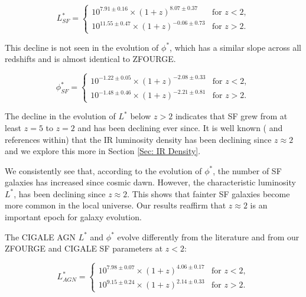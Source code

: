\begin{equation*}
    L^{*}_{SF} =
    \begin{cases} 
        10^{7.91 \pm 0.16} \times (1+z)^{8.07 \pm 0.37} & \text{for } z < 2, \\
        10^{11.55 \pm 0.47} \times (1+z)^{-0.06 \pm 0.73} & \text{for } z > 2.
    \end{cases}
\end{equation*}

This decline is not seen in the evolution of $\phi^{*}$, which has a similar slope across all redshifts and is almost identical to ZFOURGE. 

\begin{equation*}
    \phi^{*}_{SF} =
    \begin{cases} 
        10^{-1.22 \pm 0.05} \times (1+z)^{-2.08 \pm 0.33} & \text{for } z < 2, \\
        10^{-1.48 \pm 0.46} \times (1+z)^{-2.21 \pm 0.81} & \text{for } z > 2.
    \end{cases}
\end{equation*}

The decline in the evolution of $L^{*}$ below $z>2$ indicates that SF grew from at least $z=5$ to $z=2$ and has been declining ever since. It is well known (\citealp{gruppioni_herschel_2013,  madau_cosmic_2014} and references within) that the IR luminosity density has been declining since $z\approx2$ and we explore this more in Section \ref{Sec: IR Density}. 

We consistently see that, according to the evolution of $\phi^{*}$, the number of SF galaxies has increased since cosmic dawn. However, the characteristic luminosity $L^{*}$, has been declining since $z\approx2$. This shows that fainter SF galaxies become more common in the local universe. Our results reaffirm that $z\approx2$ is an important epoch for galaxy evolution.

The CIGALE AGN $L^{*}$ and $\phi^{*}$ evolve differently from the literature and from our ZFOURGE and CIGALE SF parameters at $z<2$:

\begin{equation*}
    L^{*}_{AGN} =
    \begin{cases} 
        10^{7.98 \pm 0.07} \times (1+z)^{4.06 \pm 0.17} & \text{for } z < 2, \\
        10^{9.15 \pm 0.24} \times (1+z)^{2.14 \pm 0.33} & \text{for } z > 2.
    \end{cases}
\end{equation*}

